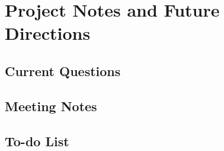\documentclass[12pt]{book}
\begin{document}


\clearpage



\clearpage



\clearpage



\clearpage



\clearpage





\chapter{Project Notes and Future Directions}


\section{Current Questions}




\section{Meeting Notes}





\section{To-do List}











\nocite{*}

\end{document}
